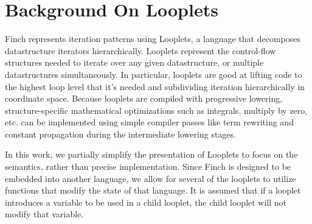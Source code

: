\section{Background On Looplets}
Finch represents iteration patterns using Looplets, a language that decomposes
datastructure iterators hierarchically. Looplets represent the control-flow
structures needed to iterate over any given datastructure, or multiple
datastructures simultaneously. In particular, looplets are good at lifting code
to the highest loop level that it's needed and subdividing iteration
hierarchically in coordinate space. Because looplets are compiled with
progressive lowering, structure-specific mathematical optimizations such as
integrals, multiply by zero, etc. can be implemented using simple compiler
passes like term rewriting and constant propagation during the intermediate
lowering stages. \cite{ahrens_looplets_2023}

In this work, we partially simplify the presentation of Looplets to focus on the
semantics, rather than precise implementation. Since Finch is designed to be
embedded into another language, we allow for several of the looplets to utilize
functions that modify the state of that language. It is assumed that if a
looplet introduces a variable to be used in a child looplet, the child looplet
will not modify that variable.

